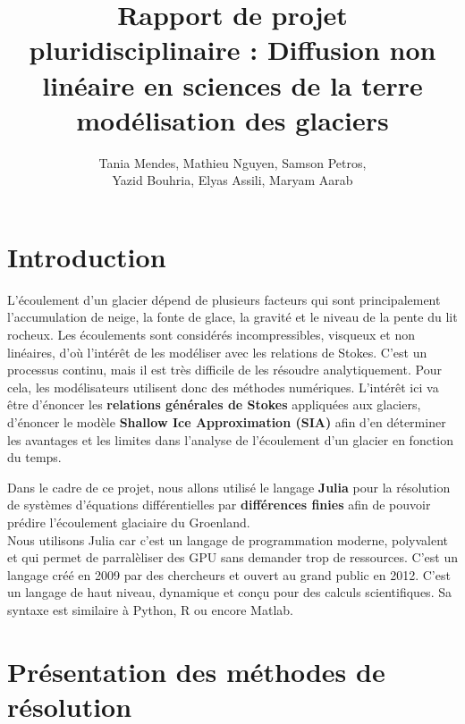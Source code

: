 \documentclass{article}
\title{\vspace{\fill}\textbf{ Rapport de projet pluridisciplinaire :} \newline Diffusion non linéaire en sciences de la terre modélisation des glaciers\vspace{\fill}}
\author{Tania Mendes, Mathieu Nguyen, Samson Petros,\\ Yazid Bouhria, Elyas Assili, Maryam Aarab}
\affil{\textbf{Encadrante} : Laetitia Le Pourhiet}
\begin{document}
\maketitle 

\newpage

\tableofcontents

\newpage
\section*{Introduction}

L’écoulement d’un glacier dépend de plusieurs facteurs qui sont principalement l’accumulation de neige, la fonte de glace, la gravité et le niveau de la pente du lit rocheux.
Les écoulements sont considérés incompressibles, visqueux et non linéaires, d’où l’intérêt de les modéliser avec les relations de Stokes.
\newline
C'est un processus continu, mais il est très difficile de les résoudre analytiquement. Pour cela, les modélisateurs utilisent donc des méthodes numériques.
L’intérêt ici va être d’énoncer les \textbf{relations générales de Stokes} appliquées aux glaciers, d’énoncer le modèle \textbf{Shallow Ice Approximation (SIA)} afin d’en déterminer les avantages et les limites dans l’analyse de l’écoulement d’un glacier en fonction du temps.


Dans le cadre de ce projet, nous allons utilisé le langage \textbf{Julia} pour la résolution de systèmes d'équations différentielles par \textbf{différences finies} afin de pouvoir prédire l'écoulement glaciaire du Groenland. \\ Nous utilisons Julia car c'est un langage de programmation moderne, polyvalent et qui permet de parralèliser des GPU sans demander trop de ressources. C'est un langage créé en 2009 par des chercheurs et ouvert au grand public en 2012. C'est un langage de haut niveau, dynamique et conçu pour des calculs scientifiques. Sa syntaxe est similaire à Python, R ou encore Matlab.


\section{Présentation des méthodes de résolution}
\end{document}

